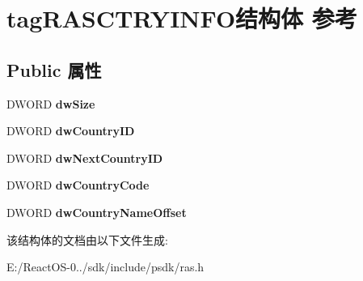 \hypertarget{structtag_r_a_s_c_t_r_y_i_n_f_o}{}\section{tag\+R\+A\+S\+C\+T\+R\+Y\+I\+N\+F\+O结构体 参考}
\label{structtag_r_a_s_c_t_r_y_i_n_f_o}
\subsection*{Public 属性}
\begin{DoxyCompactItemize}
\item 
\mbox{\label{structtag_r_a_s_c_t_r_y_i_n_f_o_a36233bb0245e8281fd4aab1e25b5a5c3}} 
D\+W\+O\+RD {\bfseries dw\+Size}
\item 
\mbox{\label{structtag_r_a_s_c_t_r_y_i_n_f_o_a49ca7576bbf8a9be55fe0b6c754af414}} 
D\+W\+O\+RD {\bfseries dw\+Country\+ID}
\item 
\mbox{\label{structtag_r_a_s_c_t_r_y_i_n_f_o_a0964b1b0ac8efbcd67ce1aafd24f26d3}} 
D\+W\+O\+RD {\bfseries dw\+Next\+Country\+ID}
\item 
\mbox{\label{structtag_r_a_s_c_t_r_y_i_n_f_o_a6944c85df88fae0a03ea0de44da64470}} 
D\+W\+O\+RD {\bfseries dw\+Country\+Code}
\item 
\mbox{\label{structtag_r_a_s_c_t_r_y_i_n_f_o_afe87e8c4f1bca6b9892d3ed0428dee5a}} 
D\+W\+O\+RD {\bfseries dw\+Country\+Name\+Offset}
\end{DoxyCompactItemize}


该结构体的文档由以下文件生成\+:\begin{DoxyCompactItemize}
\item 
E\+:/\+React\+O\+S-\/0../sdk/include/psdk/ras.\+h\end{DoxyCompactItemize}

